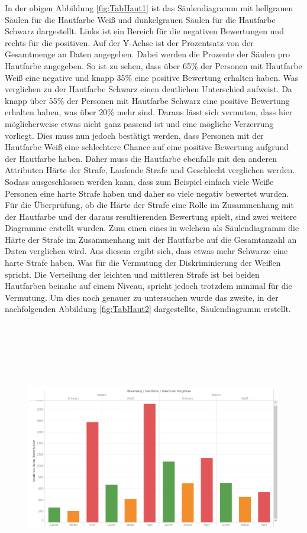 \begin{onehalfspace}
In der obigen Abbildung \ref{fig:TabHaut1} ist das Säulendiagramm mit hellgrauen Säulen für die Hautfarbe Weiß und dunkelgrauen Säulen für die Hautfarbe Schwarz dargestellt. Links ist ein Bereich für die negativen Bewertungen und rechts für die positiven. Auf der Y-Achse ist der Prozentsatz von der Gesamtmenge an Daten angegeben. Dabei werden die Prozente der Säulen pro Hautfarbe angegeben. So ist zu sehen, dass über 65\% der Personen mit Hautfarbe Weiß eine negative und knapp 35\% eine positive Bewertung erhalten haben. Was verglichen zu der Hautfarbe Schwarz einen deutlichen Unterschied aufweist. Da knapp über 55\% der Personen mit Hautfarbe Schwarz eine positive Bewertung erhalten haben, was über 20\% mehr sind. Daraus lässt sich vermuten, dass hier möglicherweise etwas nicht ganz passend ist und eine mögliche Verzerrung vorliegt. Dies muss nun jedoch bestätigt werden, dass Personen mit der Hautfarbe Weiß eine schlechtere Chance auf eine positive Bewertung aufgrund der Hautfarbe haben. Daher muss die Hautfarbe ebenfalls mit den anderen Attributen Härte der Strafe, Laufende Strafe und Geschlecht verglichen werden. Sodass ausgeschlossen werden kann, dass zum Beispiel einfach viele Weiße Personen eine harte Strafe haben und daher so viele negativ bewertet wurden.\\
Für die Überprüfung, ob die Härte der Strafe eine Rolle im Zusammenhang mit der Hautfarbe und der daraus resultierenden Bewertung spielt, sind zwei weitere Diagramme erstellt wurden. Zum einen eines in welchem als Säulendiagramm die Härte der Strafe im Zusammenhang mit der Hautfarbe auf die Gesamtanzahl an Daten verglichen wird. Aus diesem ergibt sich, dass etwas mehr Schwarze eine harte Strafe haben. Was für die Vermutung der Diskriminierung der Weißen spricht. Die Verteilung der leichten und mittleren Strafe ist bei beiden Hautfarben beinahe auf einem Niveau, spricht jedoch trotzdem minimal für die Vermutung. Um dies noch genauer zu untersuchen wurde das zweite, in der nachfolgenden Abbildung \ref{fig:TabHaut2} dargestellte, Säulendiagramm erstellt.
\begin{figure}[!h]
    \centering
    \includegraphics[width=16cm,height=12cm]{Diagramme/Tab_Haut2.PNG}

\end{figure}
\end{onehalfspace}
